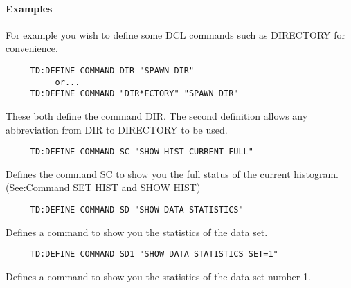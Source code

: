 \paragraph{Examples}
For  example  you  wish to define some DCL commands such as DIRECTORY
for convenience.  
\begin{verbatim}
     TD:DEFINE COMMAND DIR "SPAWN DIR" 
          or...  
     TD:DEFINE COMMAND "DIR*ECTORY" "SPAWN DIR" 
\end{verbatim}
These  both define the command DIR.  The second definition allows any
abbreviation from DIR to DIRECTORY to be used.  
\begin{verbatim}
     TD:DEFINE COMMAND SC "SHOW HIST CURRENT FULL" 
\end{verbatim}
Defines  the  command  SC  to show you the full status of the current
histogram.  (See:Command SET HIST and SHOW HIST) 
\begin{verbatim}
     TD:DEFINE COMMAND SD "SHOW DATA STATISTICS" 
\end{verbatim}
Defines a command to show you the statistics of the data set.  
\begin{verbatim}
     TD:DEFINE COMMAND SD1 "SHOW DATA STATISTICS SET=1" 
\end{verbatim}
Defines  a  command to show you the statistics of the data set number
1.  
